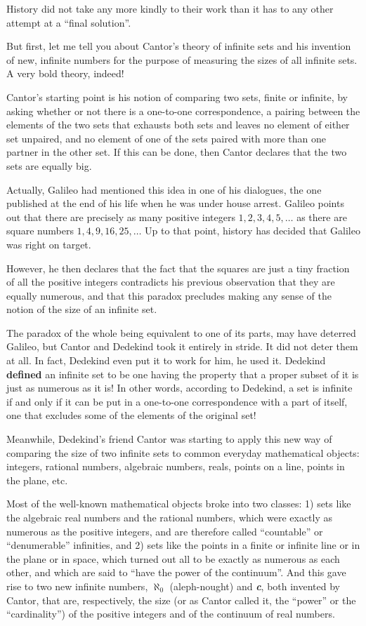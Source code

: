 \documentclass[12pt]{book}
\begin{document}
History did not take any more kindly to their work than it has to any other attempt at a
``final solution''.
 
But first, let me tell you about Cantor's theory of infinite sets and his
invention of new, infinite numbers for the purpose of measuring the sizes of all infinite sets.
A very bold theory, indeed!
 
Cantor's starting point is his notion of comparing two sets, finite or infinite,
by asking whether or not there is a one-to-one correspondence, a pairing between the
elements of the two sets that exhausts both
sets and leaves no element of either set unpaired, and no element of one of the sets
paired with more than one partner in the other set.
If this can be done, then Cantor declares that the two sets are equally big.
 
Actually, Galileo had mentioned this idea in one of his dialogues, the one published
at the end of his life when he was under house arrest. Galileo points out that there
are precisely as many positive integers $1, 2, 3, 4, 5, \ldots$ as there are square numbers
$1, 4, 9, 16, 25, \ldots$  Up to that point, history has decided that Galileo was right on
target. 
 
However, he then declares that the fact that the squares are just a tiny fraction of
all the positive integers contradicts his previous observation that they are equally
numerous, and that this paradox
precludes making any sense of the notion of the size of an infinite set.
 
The paradox of the whole being equivalent to one of its parts, may have deterred
Galileo, but Cantor and Dedekind took it entirely in stride.
It did not deter them at all. In fact, Dedekind even 
put it to work for him, he used it.
Dedekind \textbf{defined} an infinite set to be one having
the property that
a proper subset of it is just as numerous as it is!
In other words, according to Dedekind,
a set is infinite if and only if it can be put in a one-to-one correspondence
with a part of itself, one that excludes some of the elements of the original set!
 
Meanwhile, Dedekind's friend Cantor
was starting to apply this new way of comparing the size of
two infinite sets to common everyday mathematical objects: integers, rational numbers, algebraic
numbers, reals, points on a line, points in the plane, etc.
 
Most of the well-known mathematical objects broke into two classes: 1) sets like
the algebraic real numbers and the rational numbers, which were exactly as numerous
as the positive integers, and are therefore called ``countable'' or ``denumerable'' infinities,
and 2) sets like the points in a finite or infinite line or in the plane or in space,
which turned out all to be exactly as numerous as each other, and which are said to 
``have the power of the continuum''.
And this gave rise to two new infinite numbers,
$\aleph_0$ (aleph-nought) and \textbf{\emph{c}}, both invented by Cantor,
that are, respectively, the size (or as Cantor called it, the ``power''
or the ``cardinality'') of the positive integers and of the continuum of real numbers.
 
\end{document}
